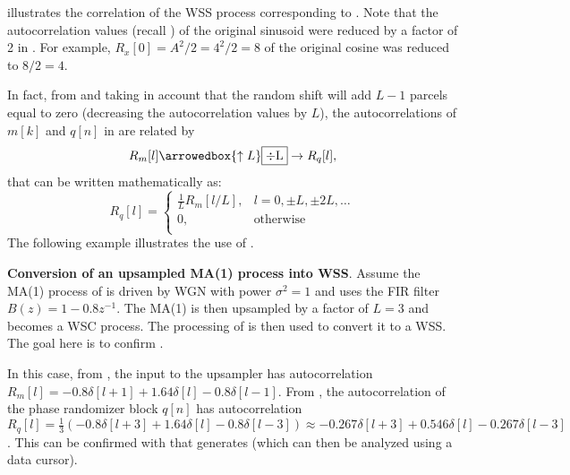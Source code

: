  illustrates the correlation of the WSS process corresponding to .
Note that the autocorrelation values (recall ) of the original sinusoid were reduced by a factor of 2 in . For example, $R_x[0]=A^2/2=4^2/2=8$ of the original cosine was reduced to $8/2=4$.
\eExample

In fact, from  and taking in account that the random shift will add
$L-1$ parcels equal to zero (decreasing the autocorrelation values by $L$), the autocorrelations 
of $m[k]$ and $q[n]$ in  are related by
\[
R_m[l] \arrowedbox{\uparrow{L}} \boxed{\div \mbox{L}} \rightarrow R_q[l],
\]
that can be written mathematically as:
\begin{equation}
R_q[l]  = \left\{\begin{array}{cl}\frac{1}{L}  R_m[l/L],& l=0, \pm L, \pm 2L, \ldots\\ 0, & \text{otherwise} \\ \end{array}\right. 
\label{eq:randomShiftXcorr}
\end{equation}
The following example illustrates the use of .



\bExample \textbf{Conversion of an upsampled MA(1) process into WSS}.
Assume the MA(1) process of  is driven by WGN with power $\sigma^2=1$ and uses the FIR filter $B(z) = 1 - 0.8z^{-1}$. The MA(1) is then upsampled by a factor of $L=3$ and
becomes a WSC process. The processing of  is then used to convert it to
a WSS. The goal here is to confirm .

In this case, from , the input to the upsampler has autocorrelation
$R_m[l] = -0.8\delta[l+1] + 1.64 \delta[l] -0.8 \delta[l-1]$. From , the
autocorrelation of the phase randomizer block $q[n]$ has autocorrelation
$R_q[l] = \frac{1}{3}(-0.8\delta[l+3] + 1.64 \delta[l] -0.8 \delta[l-3]) 
\approx -0.267 \delta[l+3] + 0.546 \delta[l] -0.267\delta[l-3]$. 
This can be confirmed with
 that generates  (which
can then be analyzed using a data cursor).

